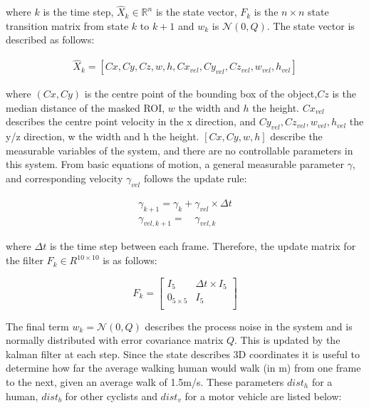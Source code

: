 \documentclass[11pt,twoside]{report}
\begin{document}
where $k$ is the time step, $\hat{X}_{k} \in \mathbb{R}^{n}$ is the state vector, $F_{k}$ is the $n \times n$ state transition matrix from state $k$ to $k+1$ and $w_{k}$ is $\mathcal{N}(0,Q)$. The state vector is described as follows:

\begin{equation}
\begin{aligned}
\hat{X}_{k} =  [Cx,Cy,Cz,w,h,Cx_{vel},Cy_{vel},Cz_{vel},w_{vel},h_{vel}]
\end{aligned}
\end{equation}

where $(Cx,Cy)$ is the centre point of the bounding box of the object,$Cz$ is the median distance of the masked ROI, $w$ the width and $h$ the height. $Cx_{vel}$ describes the centre point velocity in the x direction, and $Cy_{vel},Cz_{vel},w_{vel},h_{vel}$ the y/z direction, w the width and h the height. $[Cx,Cy,w,h]$ describe the measurable variables of the system, and there are no controllable parameters in this system. From basic equations of motion, a general measurable parameter $\gamma$, and corresponding velocity  $\gamma_{vel}$ follows the update rule:

\begin{equation}
\begin{aligned}
\gamma_{k+1} = \gamma_{k} + \gamma_{vel} \times \Delta t \\
\gamma_{vel,k+1} = \quad \gamma_{vel,k}
\end{aligned}
\end{equation}

where $\Delta t$ is the time step between each frame. Therefore, the update matrix for the filter $F_{k} \in R^{10 \times 10}$ is as follows:

\begin{equation}
F_{k} = 
\begin{bmatrix}
I_{5} & \Delta t \times I_{5} \\[0.3em]

0_{5 \times 5} & I_{5} \\[0.3em]
\end{bmatrix}
\end{equation}

The final term $w_{k} = \mathcal{N}(0,Q)$ describes the process noise in the system and is normally distributed with error covariance matrix $Q$. This is updated by the kalman filter at each step. Since the state describes 3D coordinates it is useful to determine how far the average walking human would walk (in m) from one frame to the next, given an average walk of 1.5m/s. These parameters $dist_{h}$ for a human, $dist_{b}$ for other cyclists and $dist_{v}$ for a motor vehicle are listed below:
\end{document}
